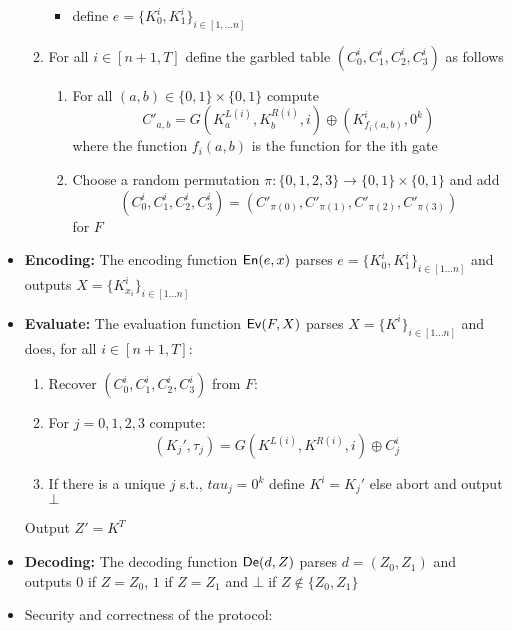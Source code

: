\begin{itemize}
\begin{enumerate}
\begin{itemize}
        \item define $e = \{K_0^i, K_1^i\}_{i \in [1, \dots n]}$
        \end{itemize}
        \item For all $i \in [n+1, T]$ define the garbled table $(C_0^i, C_1^i, C_2^i, C_3^i)$ as follows
        \begin{enumerate}
            \item For all $(a,b) \in \{0,1\} \times \{0,1\}$ compute
            \begin{equation*}
                C'_{a,b} = G(K_a^{L(i)}, K_b^{R(i)}, i) \oplus (K^i_{f_i(a,b)}, 0^k)
            \end{equation*}
            where the function $f_i(a,b)$ is the function for the ith gate
            \item Choose a random permutation $\pi: \{0,1,2,3\} \rightarrow \{0,1\} \times \{0,1\}$ and add
            \begin{equation*}
                (C_0^i, C_1^i, C_2^i, C_3^i) = (C'_{\pi(0)}, C'_{\pi(1)}, C'_{\pi(2)}, C'_{\pi(3)})
            \end{equation*}
            for $F$
        \end{enumerate}
    \end{enumerate}
    \item \textbf{Encoding:} The encoding function $\mathsf{En}(e,x)$ parses $e = \{K_0^i, K_1^i\}_{i \in [1\dots n]}$ and outputs $X= \{K_{x_i}^i\}_{i \in [1 \dots n]}$
    \item \textbf{Evaluate:} The evaluation function $\mathsf{Ev}(F,X)$ parses $X= \{K^i\}_{i \in [1 \dots n]}$ and does, for all $i \in [n+1, T]$:
    \begin{enumerate}
        \item Recover $(C_0^i, C_1^i, C_2^i, C_3^i)$ from $F$:
        \item For $j = 0, 1,2,3$ compute:
        \begin{equation*}
            (K_j', \tau_j) = G(K^{L(i)}, K^{R(i)}, i) \oplus C_j^i
        \end{equation*}
        \item If there is a unique $j$ s.t., $tau_j = 0^k$ define $K^i = K_j'$ else abort and output $\bot$
    \end{enumerate}
    Output $Z' = K^T$
    \item \textbf{Decoding:} The decoding function $\mathsf{De}(d, Z)$ parses $d= (Z_0, Z_1)$ and outputs $0$ if $Z = Z_0$, $1$ if $Z = Z_1$ and $\bot$ if $Z \notin \{Z_0, Z_1\}$
    \item Security and correctness of the protocol:

\end{itemize}
